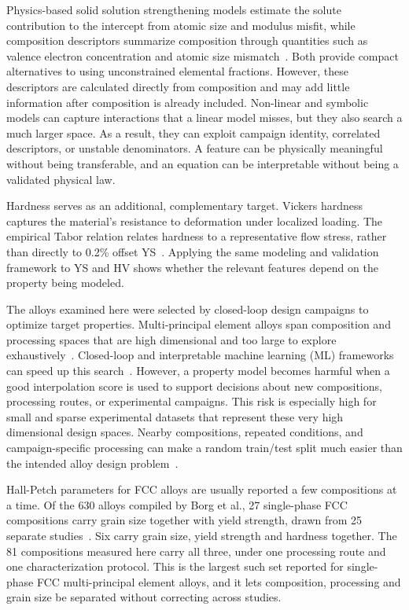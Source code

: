 \documentclass[5p,times,twocolumn]{elsarticle}
\begin{document}
Physics-based solid solution strengthening models estimate the solute contribution to the intercept from atomic size and modulus misfit, while composition descriptors summarize composition through quantities such as valence electron concentration and atomic size mismatch~\cite{Varvenne2016,Varvenne2017,Labusch1970,TodaCaraballo2015,Wen2021SSS}. Both provide compact alternatives to using unconstrained elemental fractions. However, these descriptors are calculated directly from composition and may add little information after composition is already included. Non-linear and symbolic models can capture interactions that a linear model misses, but they also search a much larger space. As a result, they can exploit campaign identity, correlated descriptors, or unstable denominators. A feature can be physically meaningful without being transferable, and an equation can be interpretable without being a validated physical law.

Hardness serves as an additional, complementary target. Vickers hardness captures the material's resistance to deformation under localized loading. The empirical Tabor relation relates hardness to a representative flow stress, rather than directly to 0.2\% offset YS~\cite{Tabor1951,Dao2001}. Applying the same modeling and validation framework to YS and HV shows whether the relevant features depend on the property being modeled.

The alloys examined here were selected by closed-loop design campaigns to optimize target properties. Multi-principal element alloys span composition and processing spaces that are high dimensional and too large to explore exhaustively~\cite{Cantor2004,Yeh2004,George2019,Miracle2017}. Closed-loop and interpretable machine learning (ML) frameworks can speed up this search~\cite{Rao2022,Hastings2025FCC,Mulukutla2024BIRDSHOT,Mulukutla2026BRAVE, padhy2024experimentally, padhy2025integrated}. However, a property model becomes harmful when a good interpolation score is used to support decisions about new compositions, processing routes, or experimental campaigns. This risk is especially high for small and sparse experimental datasets that represent these very high dimensional design spaces. Nearby compositions, repeated conditions, and campaign-specific processing can make a random train/test split much easier than the intended alloy design problem~\cite{Meredig2018,WangAYT2020,LiMDHIT2024}.

Hall-Petch parameters for FCC alloys are usually reported a few compositions at a time. Of the 630 alloys compiled by Borg et al., 27 single-phase FCC compositions carry grain size together with yield strength, drawn from 25 separate studies~\cite{Borg2020}. Six carry grain size, yield strength and hardness together. The 81 compositions measured here carry all three, under one processing route and one characterization protocol. This is the largest such set reported for single-phase FCC multi-principal element alloys, and it lets composition, processing and grain size be separated without correcting across studies.
\end{document}
